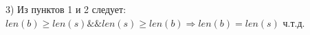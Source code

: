 \documentclass{article}
\begin{document}
\begin{flushleft}
3) Из пунктов 1 и 2 следует: $len(b) \ge len(s) \&\& len(s) \ge len(b) \Rightarrow len(b) = len(s)$ ч.т.д.

\section{}




\end{flushleft}
\end{document}

